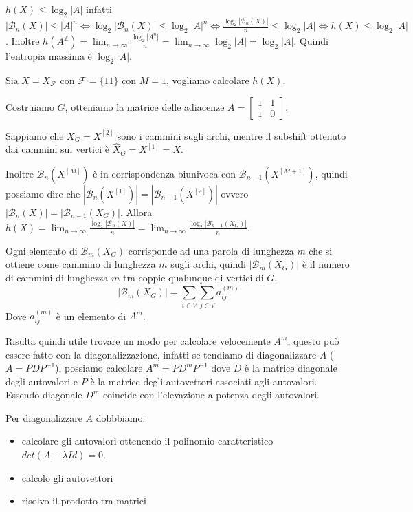 \begin{nota}
    $h(X)\le \log_2|A|$ infatti
    $|\mathcal{B}_n(X)| \le |A|^n\iff \log_2 |\mathcal{B}_n(X)| \le \log_2 |A|^n \iff
        \frac{\log_2|\mathcal{B}_n(X)|}{n}\le \log_2|A|\iff h(X)\le \log_2|A|$.
    Inoltre $h(A^\mathbb{Z}) = \lim_{n\to \infty}\frac{\log_2|A^n|}{n} =  \lim_{n\to \infty}\log_2|A| = \log_2|A|$.
    Quindi l'entropia massima è $\log_2|A|$.
\end{nota}

\begin{esempio}
    Sia $X=X_\mathcal{F}$ con $\mathcal{F} = \{11\}$ con $M=1$, vogliamo calcolare
    $h(X)$.

    Costruiamo $G$, otteniamo la matrice delle adiacenze $A=\left[\begin{array}{cc}
                1 & 1 \\
                1 & 0
            \end{array}\right]$.

    Sappiamo che $X_G = X^{[2]}$ sono i cammini sugli archi, mentre il subshift ottenuto dai cammini
    sui vertici è $\hat{X}_G = X^{[1]} =X$.

    Inoltre $\mathcal{B}_n(X^{[M]})$ è in corrispondenza biunivoca con $\mathcal{B}_{n-1}(X^{[M+1]})$,
    quindi possiamo dire che $|\mathcal{B}_n(X^{[1]})| = |\mathcal{B}_{n-1}(X^{[2]})|$
    ovvero $|\mathcal{B}_n(X)| = |\mathcal{B}_{n-1}(X_G)|$.
    Allora $h(X)=\lim_{n\to \infty}\frac{\log_2|\mathcal{B}_n(X)|}{n} = \lim_{n\to \infty}\frac{\log_2|\mathcal{B}_{n-1}(X_G)|}{n}$.
\end{esempio}

Ogni elemento di $\mathcal{B}_{m}(X_G)$ corrisponde ad una parola di lunghezza
$m$ che si ottiene come cammino di lunghezza $m$ sugli archi, quindi
$|\mathcal{B}_{m}(X_G)|$ è il numero di cammini di lunghezza $m$ tra coppie qualunque
di vertici di $G$.
$$|\mathcal{B}_{m}(X_G)| = \sum_{i\in V}\sum_{j\in V} a_{ij}^{(m)}$$
Dove $a_{ij}^{(m)}$ è un elemento di $A^m$.

Risulta quindi utile trovare un modo per calcolare velocemente $A^m$, questo può
essere fatto con la diagonalizzazione, infatti se tendiamo di diagonalizzare $A$ ($A=PDP^{-1}$),
possiamo calcolare $A^m=PD^{m}P^{-1}$ dove $D$ è la matrice diagonale degli autovalori
e $P$ è la matrice degli autovettori associati agli autovalori. Essendo diagonale
$D^m$ coincide con l'elevazione a potenza degli autovalori.

Per diagonalizzare $A$ dobbbiamo:
\begin{itemize}
    \item calcolare gli autovalori ottenendo il polinomio caratteristico $det(A-\lambda Id) =0$.
    \item calcolo gli autovettori
    \item risolvo il prodotto tra matrici
\end{itemize}

